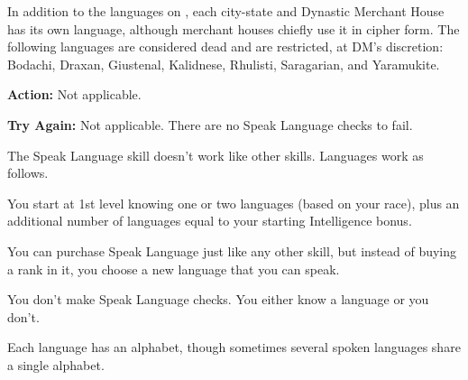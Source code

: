 
In addition to the languages on , each city-state and Dynastic Merchant House has its own language, although merchant houses chiefly use it in cipher form. The following languages are considered dead and are restricted, at DM's discretion: Bodachi, Draxan, Giustenal, Kalidnese, Rhulisti, Saragarian, and Yaramukite.

\textbf{Action:} Not applicable.

\textbf{Try Again:} Not applicable. There are no Speak Language checks to fail.

The Speak Language skill doesn't work like other skills. Languages work as follows.

\begin{itemize*}
\item You start at 1st level knowing one or two languages (based on your race), plus an additional number of languages equal to your starting Intelligence bonus.
\item You can purchase Speak Language just like any other skill, but instead of buying a rank in it, you choose a new language that you can speak.
\item You don't make Speak Language checks. You either know a language or you don't.
\item Each language has an alphabet, though sometimes several spoken languages share a single alphabet.
\end{itemize*}

